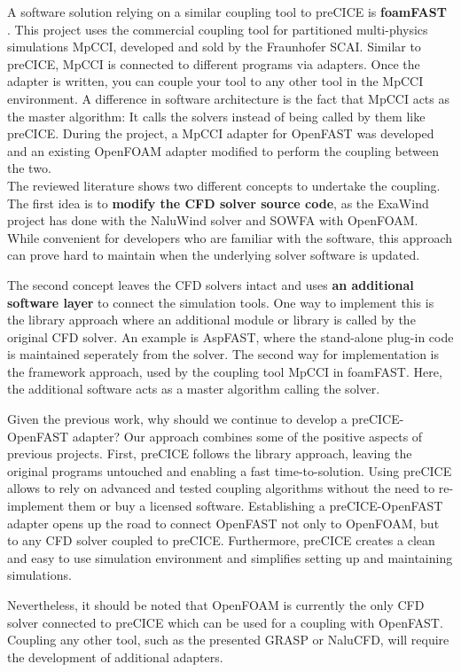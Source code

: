A software solution relying on a similar coupling tool to preCICE is \textbf{foamFAST} \cite{Weber:2017}. This project uses the commercial coupling tool for partitioned multi-physics simulations MpCCI, developed and sold by the Fraunhofer SCAI. Similar to preCICE, MpCCI is connected to different programs via adapters. Once the adapter is written, you can couple your tool to any other tool in the MpCCI environment. A difference in software architecture is the fact that MpCCI acts as the master algorithm: It calls the solvers instead of being called by them like preCICE. During the project, a MpCCI adapter for OpenFAST was developed and an existing OpenFOAM adapter modified to perform the coupling between the two.\\

The reviewed literature shows two different concepts to undertake the coupling. The first idea is to \textbf{modify the CFD solver source code}, as the ExaWind project has done with the NaluWind solver and SOWFA with OpenFOAM. While convenient for developers who are familiar with the software, this approach can prove hard to maintain when the underlying solver software is updated.

The second concept leaves the CFD solvers intact and uses \textbf{an additional software layer} to connect the simulation tools. One way to implement this is the library approach where an additional module or library is called by the original CFD solver. An example is AspFAST, where the stand-alone plug-in code is maintained seperately from the solver. The second way for implementation is the framework approach, used by the coupling tool MpCCI in foamFAST. Here, the additional software acts as a master algorithm calling the solver.

Given the previous work, why should we continue to develop a preCICE-OpenFAST adapter?
Our approach combines some of the positive aspects of previous projects. First, preCICE follows the library approach, leaving the original programs untouched and enabling a fast time-to-solution. Using preCICE allows to rely on advanced and tested coupling algorithms without the need to re-implement them or buy a licensed software. Establishing a preCICE-OpenFAST adapter opens up the road to connect OpenFAST not only to OpenFOAM, but to any CFD solver coupled to preCICE. Furthermore, preCICE creates a clean and easy to use simulation environment and simplifies setting up and maintaining simulations.

Nevertheless, it should be noted that OpenFOAM is currently the only CFD solver connected to preCICE which can be used for a coupling with OpenFAST. Coupling any other tool, such as the presented GRASP or NaluCFD, will require the development of additional adapters.

